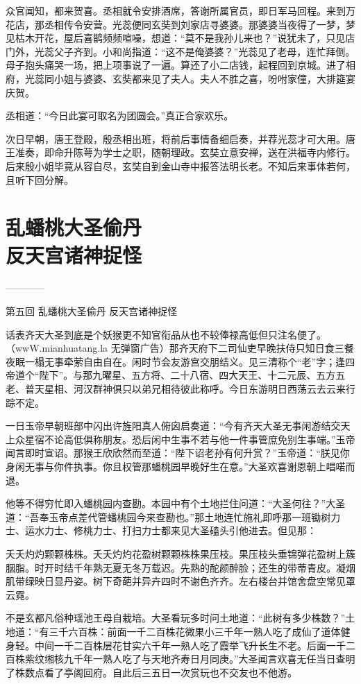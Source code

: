 \documentclass[12pt,UTF8]{ctexbook}
\begin{document}
{	众官闻知，都来贺喜。丞相就令安排酒席，答谢所属官员，即日军马回程。来到万花店，那丞相传令安营。光蕊便同玄奘到刘家店寻婆婆。那婆婆当夜得了一梦，梦见枯木开花，屋后喜鹊频频喧噪，想道：“莫不是我孙儿来也？”说犹未了，只见店门外，光蕊父子齐到。小和尚指道：“这不是俺婆婆？”光蕊见了老母，连忙拜倒。母子抱头痛哭一场，把上项事说了一遍。算还了小二店钱，起程回到京城。进了相府，光蕊同小姐与婆婆、玄奘都来见了夫人。夫人不胜之喜，吩咐家僮，大排筵宴庆贺。
	
	丞相道：“今日此宴可取名为团圆会。”真正合家欢乐。
	
	次日早朝，唐王登殿，殷丞相出班，将前后事情备细启奏，并荐光蕊才可大用。唐王准奏，即命升陈萼为学士之职，随朝理政。玄奘立意安禅，送在洪福寺内修行。后来殷小姐毕竟从容自尽，玄奘自到金山寺中报答法明长老。不知后来事体若何，且听下回分解。
	


\chapter[乱蟠桃大圣偷丹\ 反天宫诸神捉怪]{乱蟠桃大圣偷丹\\反天宫诸神捉怪}

------------

第五回 乱蟠桃大圣偷丹 反天宫诸神捉怪

话表齐天大圣到底是个妖猴更不知官衔品从也不较俸禄高低但只注名便了。（wwW.mianhuatang.la 无弹窗广告）那齐天府下二司仙吏早晚扶侍只知日食三餐夜眠一榻无事牵萦自由自在。闲时节会友游宫交朋结义。见三清称个“老”字；逢四帝道个“陛下”。与那九曜星、五方将、二十八宿、四大天王、十二元辰、五方五老、普天星相、河汉群神俱只以弟兄相待彼此称呼。今日东游明日西荡云去云来行踪不定。

一日玉帝早朝班部中闪出许旌阳真人俯囟启奏道：“今有齐天大圣无事闲游结交天上众星宿不论高低俱称朋友。恐后闲中生事不若与他一件事管庶免别生事端。”玉帝闻言即时宣诏。那猴王欣欣然而至道：“陛下诏老孙有何升赏？”玉帝道：“朕见你身闲无事与你件执事。你且权管那蟠桃园早晚好生在意。”大圣欢喜谢恩朝上唱喏而退。

他等不得穷忙即入蟠桃园内查勘。本园中有个土地拦住问道：“大圣何往？”大圣道：“吾奉玉帝点差代管蟠桃园今来查勘也。”那土地连忙施礼即呼那一班锄树力士、运水力士、修桃力士、打扫力士都来见大圣磕头引他进去。但见那：

夭夭灼灼颗颗株株。夭夭灼灼花盈树颗颗株株果压枝。果压枝头垂锦弹花盈树上簇胭脂。时开时结千年熟无夏无冬万载迟。先熟的酡颜醉脸；还生的带蒂青皮。凝烟肌带绿映日显丹姿。树下奇葩并异卉四时不谢色齐齐。左右楼台并馆舍盘空常见罩云霓。

不是玄都凡俗种瑶池王母自栽培。大圣看玩多时问土地道：“此树有多少株数？”土地道：“有三千六百株：前面一千二百株花微果小三千年一熟人吃了成仙了道体健身轻。中间一千二百株层花甘实六千年一熟人吃了霞举飞升长生不老。后面一千二百株紫纹缃核九千年一熟人吃了与天地齐寿日月同庚。”大圣闻言欢喜无任当日查明了株数点看了亭阁回府。自此后三五日一次赏玩也不交友也不他游。

}
\end{document}
